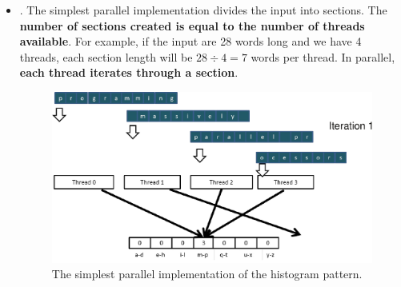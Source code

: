 \begin{itemize}
    \item {}. The simplest parallel implementation divides the input into sections. The \textbf{number of sections created is equal to the number of threads available}. For example, if the input are 28 words long and we have 4 threads, each section length will be $28 \div 4 = 7$ words per thread. In parallel, \textbf{each thread iterates through a section}.
    \begin{figure}[!htp]
        \centering
        \includegraphics[width=\textwidth]{img/histogram-pattern-1.pdf}
        \caption{The simplest parallel implementation of the histogram pattern.}
    \end{figure}


\end{itemize}
